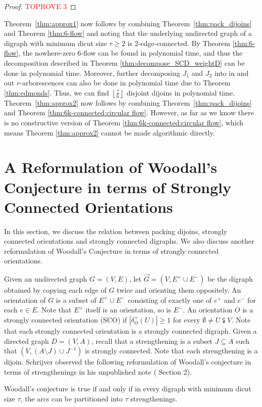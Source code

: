 \documentclass[runningheads]{llncs}
\newcommand{\rounddown}[1]{\left\lfloor#1\right\rfloor}
\begin{document}
\begin{proof}\textcolor{red}{TOPROVE 3}\end{proof}

Theorem~\ref{thm:approx1} now follows by combining Theorem~\ref{thm:pack_dijoins} and Theorem \ref{thm:6-flow} and noting that the underlying undirected graph of a digraph with minimum dicut size $\tau\geq 2$ is $2$-edge-connected. By Theorem \ref{thm:6-flow}, the nowhere-zero $6$-flow can be found in polynomial time, and thus the decomposition described in Theorem \ref{thm:decompose_SCD_weightD} can be done in polynomial time. Moreover, further decomposing $J_1$ and $J_2$ into in and out $r$-arborescences can also be done in polynomial time due to Theorem \ref{thm:edmonds}. Thus, we can find $\rounddown{\frac{\tau}{6}}$ disjoint dijoins in polynomial time. 
Theorem~\ref{thm:approx2} now follows by combining Theorem~\ref{thm:pack_dijoins} and Theorem \ref{thm:6k-connected:circular flow}. However, as far as we know there is no constructive version of Theorem \ref{thm:6k-connected:circular flow}, which means Theorem \ref{thm:approx2} cannot be made algorithmic directly.









\section{A Reformulation of Woodall's Conjecture in terms of Strongly Connected Orientations}\label{sec:SCO}
In this section, we discuss the relation between packing dijoins, strongly connected orientations and strongly connected digraphs. We also discuss another reformulation of Woodall's Conjecture in terms of strongly connected orientations.





    Given an undirected graph $G=(V,E)$, let $\vec{G}=(V,E^+\cup E^-)$ be the digraph obtained by copying each edge of $G$ twice and orienting them oppositely. 
    An orientation of $G$ is a subset of $E^+\cup E^-$ consisting of exactly one of $e^+$ and $e^-$ for each $e\in E$. Note that $E^+$ itself is an orientation, so is $E^-$. An orientation $O$ is a strongly connected orientation (SCO) if $|\delta_O^+(U)|\geq 1$ for every $\emptyset \neq U\subsetneqq V$. Note that each strongly connected orientation is a strongly connected digraph.
Given a directed graph $D=(V,A)$, recall that a strengthening is a subset $J\subseteq A$ such that $(V,(A\setminus J)\cup J^{-1})$ is strongly connected. Note that each strengthening is a dijoin. 
Schrijver observed the following reformulation of Woodall's conjecture in terms of strengthenings in his unpublished note (\cite{schrijverobervation} Section 2).
\begin{theorem}\label{thm:eq_strenghthening}
    Woodall's conjecture is true if and only if in every digraph with minimum dicut size $\tau$, the arcs can be partitioned into $\tau$ strengthenings.
\end{theorem} 
\end{document}
